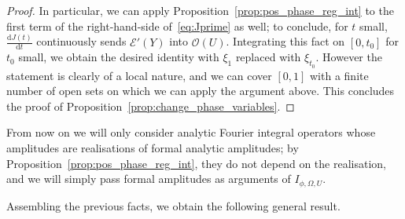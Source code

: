 \documentclass[AHL,Unicode,longabstracts,published]{cedram}
\newcommand{\clE}{\mathcal{E}}
\newcommand{\clO}{\mathcal{O}}
\newcommand\1{\mathds{1}}
\newcommand{\dd}{\mathrm{d}}
\begin{document}
\begin{proof}
In particular, we can apply Proposition~\ref{prop:pos_phase_reg_int} to the first term of the right-hand-side of~\eqref{eq:Jprime} as well; to conclude, for $t$ small, $\frac{\dd J(t)}{\dd t}$ continuously sends $\clE'(Y)$ into $\clO(U)$. Integrating this fact on $[0,t_0]$ for $t_0$ small, we obtain the desired identity with $\xi_1$ replaced with $\xi_{t_0}$. However the statement is clearly of a local nature, and we can cover $[0,1]$ with a finite number of open sets on which we can apply the argument above. This concludes the proof of Proposition~\ref{prop:change_phase_variables}.
\end{proof}

From now on we will only consider analytic Fourier integral operators whose amplitudes are realisations of formal analytic amplitudes; by Proposition~\ref{prop:pos_phase_reg_int}, they do not depend on the realisation, and we will simply pass formal amplitudes as arguments of $I_{\phi,\Omega,U}$.

Assembling the previous facts, we obtain the following general result.
\end{document}
